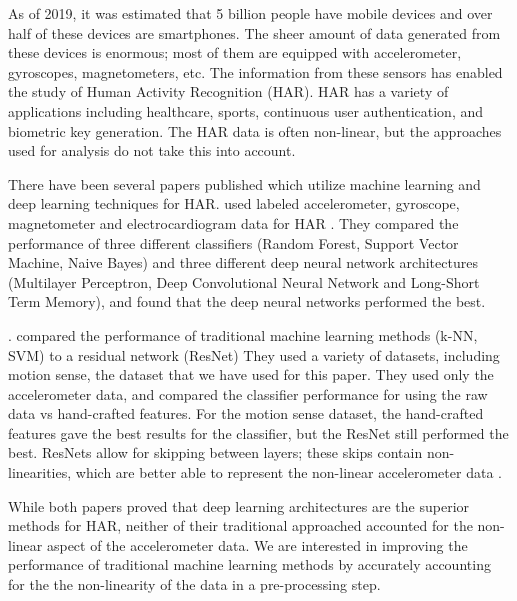 As of 2019, it was estimated that 5 billion people have mobile devices and over half of these devices are smartphones. The sheer amount of data generated from these devices is enormous; most of them are equipped with accelerometer, gyroscopes, magnetometers, etc. The information from these sensors has enabled  the study of Human Activity Recognition (HAR). HAR has a variety of applications including healthcare, sports, continuous user authentication, and biometric key generation. The HAR data is often non-linear, but the approaches used for analysis do not take this into account.

There have been several papers published which utilize machine learning and deep learning techniques for HAR. \citet{masum2019human} used labeled accelerometer, gyroscope, magnetometer and electrocardiogram data for HAR \cite{masum2019human}. They compared the performance of three different classifiers (Random Forest, Support Vector Machine, Naive Bayes) and three different deep neural network architectures (Multilayer Perceptron, Deep Convolutional Neural Network and Long-Short Term Memory), and found that the deep neural networks performed the best. 

\citet{ferrari2019hand}. compared the performance of traditional machine learning methods (k-NN, SVM) to a residual network (ResNet) They used a variety of datasets, including motion sense, the dataset that we have used for this paper. They used only the accelerometer data, and compared the classifier performance for using the raw data vs hand-crafted features. For the motion sense dataset, the hand-crafted features gave the best results for the classifier, but the ResNet still performed the best. ResNets allow for skipping between layers; these skips contain non-linearities, which are better able to represent the non-linear accelerometer data \cite{he2016deep}.

While both papers proved that deep learning architectures are the superior methods for HAR, neither of their traditional approached accounted for the non-linear aspect of the accelerometer data. We are interested in improving the performance of traditional machine learning methods by accurately accounting for the the non-linearity of the data in a pre-processing step. 
